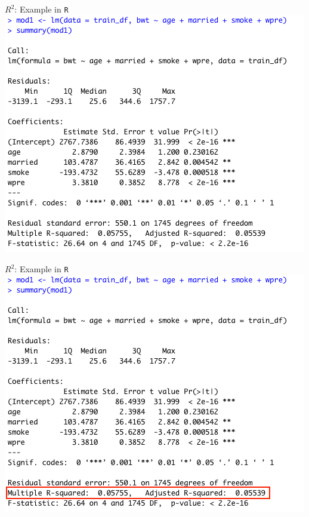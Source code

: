 \documentclass[10pt,t]{beamer}
\begin{document}
\begin{frame}{$R^2$: Example in \texttt{R}}
\centering \includegraphics[scale=0.4]{r2_example1.png}
\end{frame}

\begin{frame}{$R^2$: Example in \texttt{R}}
\centering \includegraphics[scale=0.4]{r2_example1_2.png}
\end{frame}
\end{document}
